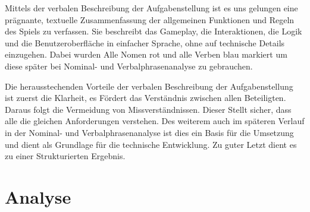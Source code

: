 \documentclass[a4paper,12pt]{article}
\begin{document}
Mittels der verbalen Beschreibung der Aufgabenstellung ist es uns gelungen eine prägnante, textuelle Zusammenfassung der allgemeinen Funktionen und Regeln des Spiels zu verfassen. Sie beschreibt das Gameplay, die Interaktionen, die Logik und die Benutzeroberfläche in einfacher Sprache, ohne auf technische Details einzugehen. Dabei wurden Alle Nomen rot und alle Verben blau markiert um diese später bei Nominal- und Verbalphrasenanalyse zu gebrauchen. \par\vspace{0.5em} Die herausstechenden Vorteile der verbalen Beschreibung der Aufgabenstellung ist zuerst die Klarheit, es Fördert das Verständnis zwischen allen Beteiligten. Daraus folgt die Vermeidung von Missverständnissen. Dieser Stellt sicher, dass alle die gleichen Anforderungen verstehen. Des weiterem auch im späteren Verlauf in der Nominal- und Verbalphrasenanalyse ist dies ein Basis für die Umsetzung und dient als Grundlage für die technische Entwicklung. Zu guter Letzt dient es zu einer Strukturierten Ergebnis.
\clearpage
\section{Analyse}
\end{document}
